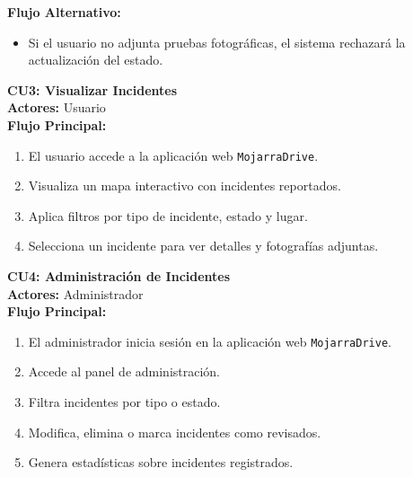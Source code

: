 \textbf{Flujo Alternativo:}
\begin{itemize}
    \item Si el usuario no adjunta pruebas fotográficas, el sistema rechazará la actualización del estado.
\end{itemize}

\vspace{0.5cm}

\textbf{\large CU3: Visualizar Incidentes} \\

\textbf{Actores:} Usuario \\

\textbf{Flujo Principal:}
\begin{enumerate}
    \item El usuario accede a la aplicación web \texttt{MojarraDrive}.
    \item Visualiza un mapa interactivo con incidentes reportados.
    \item Aplica filtros por tipo de incidente, estado y lugar.
    \item Selecciona un incidente para ver detalles y fotografías adjuntas.
\end{enumerate}

\vspace{0.5cm}

\textbf{\large CU4: Administración de Incidentes} \\

\textbf{Actores:} Administrador \\

\textbf{Flujo Principal:}
\begin{enumerate}
    \item El administrador inicia sesión en la aplicación web
    \texttt{MojarraDrive}.
    \item Accede al panel de administración.
    \item Filtra incidentes por tipo o estado.
    \item Modifica, elimina o marca incidentes como revisados.
    \item Genera estadísticas sobre incidentes registrados.
\end{enumerate}
